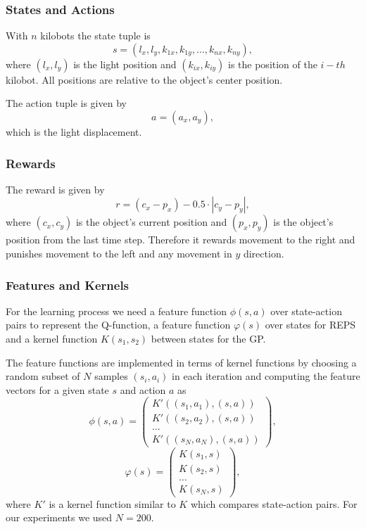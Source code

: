 \documentclass[twoside]{article}
\begin{document}
\subsubsection{States and Actions}

With $n$ kilobots the state tuple is
$$s = (l_x, l_y, k_{1x}, k_{1y}, \dots, k_{nx}, k_{ny}), $$
where $(l_x, l_y)$ is the light position and $(k_{ix}, k_{iy})$ is the position
of the $i-th$ kilobot. All positions are relative to the object's center
position.

The action tuple is given by
$$a = (a_x, a_y),$$
which is the light displacement.

\subsubsection{Rewards}

The reward is given by
$$ r = (c_x - p_x) - 0.5 \cdot |c_y - p_y|, $$
where $(c_x, c_y)$ is the object's current position and $(p_x, p_y)$ is the
object's position from the last time step. Therefore it rewards movement to the
right and punishes movement to the left and any movement in $y$ direction.

\subsubsection{Features and Kernels}

For the learning process we need a feature function $\phi(s, a)$ over
state-action pairs to represent the Q-function, a feature function $\varphi(s)$
over states for REPS and a kernel function $K(s_1, s_2)$ between states for the
GP.

The feature functions are implemented in terms of kernel functions by
choosing a random subset of $N$ samples $(s_i, a_i)$ in each iteration and
computing the feature vectors for a given state $s$ and action $a$ as
$$
\phi(s, a) = \left(
\begin{array}{c}
    K'((s_1, a_1), (s, a)) \\
    K'((s_2, a_2), (s, a)) \\
    \dots \\
    K'((s_N, a_N), (s, a))
\end{array} \right),
$$
$$
\varphi(s) = \left(
\begin{array}{c}
    K(s_1, s) \\
    K(s_2, s) \\
    \dots \\
    K(s_N, s)
\end{array} \right),
$$
where $K'$ is a kernel function similar to $K$ which compares state-action
pairs. For our experiments we used $N = 200$.
\end{document}
